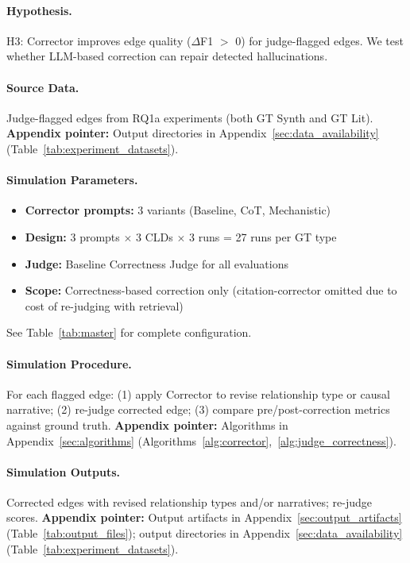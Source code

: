 \paragraph{Hypothesis.}
H3: Corrector improves edge quality ($\Delta$F1 $>$ 0) for judge-flagged edges. We test whether LLM-based correction can repair detected hallucinations.

\paragraph{Source Data.}
Judge-flagged edges from RQ1a experiments (both GT Synth and GT Lit).
\textbf{Appendix pointer:} Output directories in Appendix~\ref{sec:data_availability} (Table~\ref{tab:experiment_datasets}).

\paragraph{Simulation Parameters.}
\begin{itemize}[noitemsep]
    \item \textbf{Corrector prompts:} 3 variants (Baseline, CoT, Mechanistic)
    \item \textbf{Design:} 3 prompts $\times$ 3 CLDs $\times$ 3 runs = 27 runs per GT type
    \item \textbf{Judge:} Baseline Correctness Judge for all evaluations
    \item \textbf{Scope:} Correctness-based correction only (citation-corrector omitted due to cost of re-judging with retrieval)
\end{itemize}
See Table~\ref{tab:master} for complete configuration.

\paragraph{Simulation Procedure.}
For each flagged edge: (1) apply Corrector to revise relationship type or causal narrative; (2) re-judge corrected edge; (3) compare pre/post-correction metrics against ground truth.
\textbf{Appendix pointer:} Algorithms in Appendix~\ref{sec:algorithms} (Algorithms~\ref{alg:corrector},~\ref{alg:judge_correctness}).

\paragraph{Simulation Outputs.}
Corrected edges with revised relationship types and/or narratives; re-judge scores.
\textbf{Appendix pointer:} Output artifacts in Appendix~\ref{sec:output_artifacts} (Table~\ref{tab:output_files}); output directories in Appendix~\ref{sec:data_availability} (Table~\ref{tab:experiment_datasets}).

